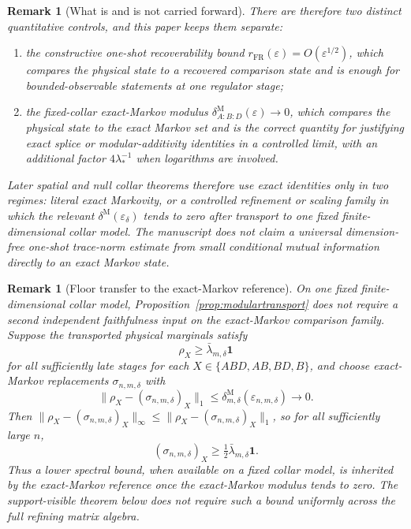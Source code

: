 \documentclass[11pt]{article}
\newtheorem{remark}[theorem]{Remark}
\begin{document}
\begin{remark}[What is and is not carried forward]
There are therefore two distinct quantitative controls, and this paper keeps them separate:
\begin{enumerate}[leftmargin=2em]
\item the constructive one-shot recoverability bound \(r_{\mathrm{FR}}(\varepsilon)=O(\varepsilon^{1/2})\), which compares the physical state to a recovered comparison state and is enough for bounded-observable statements at one regulator stage;
\item the fixed-collar exact-Markov modulus \(\delta^{\mathrm M}_{A:B:D}(\varepsilon)\to 0\), which compares the physical state to the exact Markov set and is the correct quantity for justifying exact splice or modular-additivity identities in a controlled limit, with an additional factor \(4\lambda_\ast^{-1}\) when logarithms are involved.
\end{enumerate}
Later spatial and null collar theorems therefore use exact identities only in two regimes: literal exact Markovity, or a controlled refinement or scaling family in which the relevant \(\delta^{\mathrm M}(\varepsilon_\delta)\) tends to zero after transport to one fixed finite-dimensional collar model. The manuscript does \emph{not} claim a universal dimension-free one-shot trace-norm estimate from small conditional mutual information directly to an exact Markov state.
\end{remark}

\begin{remark}[Floor transfer to the exact-Markov reference]
On one fixed finite-dimensional collar model, Proposition~\ref{prop:modulartransport} does not require a second independent faithfulness input on the exact-Markov comparison family. Suppose the transported physical marginals satisfy
\[
\rho_X\ge \bar\lambda_{m,\delta}\mathbf 1
\]
for all sufficiently late stages for each \(X\in\{ABD,AB,BD,B\}\), and choose exact-Markov replacements \(\sigma_{n,m,\delta}\) with
\[
\|\rho_X-(\sigma_{n,m,\delta})_X\|_1
\le
\delta^{\mathrm M}_{m,\delta}(\varepsilon_{n,m,\delta})
\longrightarrow 0.
\]
Then \(\|\rho_X-(\sigma_{n,m,\delta})_X\|_\infty\le \|\rho_X-(\sigma_{n,m,\delta})_X\|_1\), so for all sufficiently large \(n\),
\[
(\sigma_{n,m,\delta})_X
\ge
\tfrac12\bar\lambda_{m,\delta}\mathbf 1.
\]
Thus a lower spectral bound, when available on a fixed collar model, is inherited by the exact-Markov reference once the exact-Markov modulus tends to zero. The support-visible theorem below does not require such a bound uniformly across the full refining matrix algebra.
\end{remark}
\end{document}
